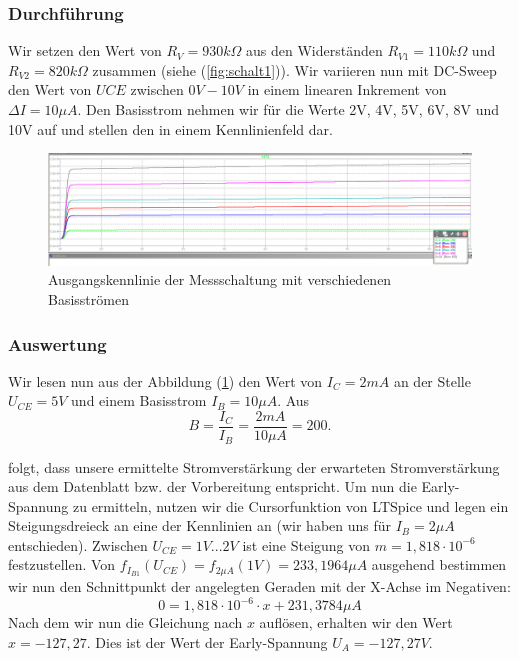 \documentclass{article}
\begin{document}
\subsubsection{Durchführung}
Wir setzen den Wert von $R_{V} = 930k\Omega$ aus den Widerständen $R_{V1} = 110k\Omega$ und $R_{V2} = 820k\Omega$ zusammen (siehe (\ref{fig:schalt1})). Wir variieren nun mit DC-Sweep den Wert von $UCE$ zwischen $0V-10V$ in einem linearen Inkrement von $\Delta I = 10\mu A$. Den Basisstrom nehmen wir für die Werte 2V, 4V, 5V, 6V, 8V  und 10V auf und stellen den in einem Kennlinienfeld dar.

\begin{figure}[h]
  \centering
  \includegraphics[width=\textwidth]{../assets/images/EL1P3/ausgangskennlinie.png}
  \caption{Ausgangskennlinie der Messschaltung mit verschiedenen Basisströmen}
  \label{fig:ausgang}
\end{figure}

\subsubsection{Auswertung}

Wir lesen nun aus der Abbildung (\ref{fig:ausgang}) den Wert von $I_{C} = 2mA$ an der Stelle $U_{CE} = 5V$ und einem Basisstrom $I_{B} = 10\mu A$. Aus
\begin{equation}
  \label{eq:3}
  B = \frac{I_{C}}{I_{B}} = \frac{2mA}{10\mu A} = 200.
\end{equation}

folgt, dass unsere ermittelte Stromverstärkung der erwarteten Stromverstärkung aus dem Datenblatt bzw. der Vorbereitung entspricht. Um nun die Early-Spannung zu ermitteln, nutzen wir die Cursorfunktion von LTSpice und legen ein Steigungsdreieck an eine der Kennlinien an (wir haben uns für $I_{B} = 2\mu A$ entschieden). Zwischen $U_{CE} = 1V...2V$ ist eine Steigung von $m = 1,818\cdot 10^{-6}$ festzustellen. Von $f_{I_{B1}}(U_{CE}) = f_{2\mu A}(1V) = 233,1964\mu A$ ausgehend bestimmen wir nun den Schnittpunkt der angelegten Geraden mit der X-Achse im Negativen:
\begin{equation}
  \label{eq:4}
  0 = 1,818\cdot 10^{-6}\cdot x + 231,3784\mu A
\end{equation}
Nach dem wir nun die Gleichung nach $x$ auflösen, erhalten wir den Wert $x = -127,27$. Dies ist der Wert der Early-Spannung $U_{A} = -127,27V$.
\newpage
\end{document}
